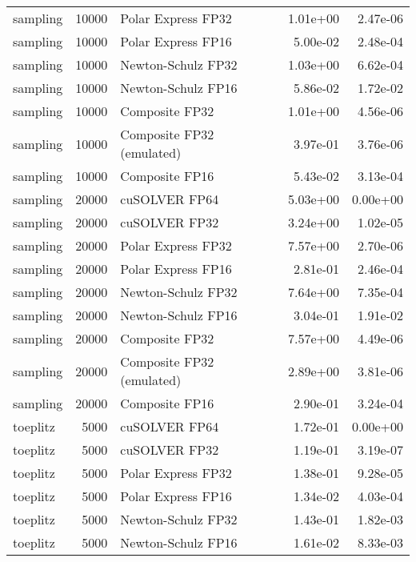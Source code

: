 \begin{table}
\begin{tabular}{lrlrr}
 sampling & 10000 &        Polar Express FP32 &  1.01e+00 &        2.47e-06 \\
 sampling & 10000 &        Polar Express FP16 &  5.00e-02 &        2.48e-04 \\
 sampling & 10000 &        Newton-Schulz FP32 &  1.03e+00 &        6.62e-04 \\
 sampling & 10000 &        Newton-Schulz FP16 &  5.86e-02 &        1.72e-02 \\
 sampling & 10000 &            Composite FP32 &  1.01e+00 &        4.56e-06 \\
 sampling & 10000 & Composite FP32 (emulated) &  3.97e-01 &        3.76e-06 \\
 sampling & 10000 &            Composite FP16 &  5.43e-02 &        3.13e-04 \\
 sampling & 20000 &             cuSOLVER FP64 &  5.03e+00 &        0.00e+00 \\
 sampling & 20000 &             cuSOLVER FP32 &  3.24e+00 &        1.02e-05 \\
 sampling & 20000 &        Polar Express FP32 &  7.57e+00 &        2.70e-06 \\
 sampling & 20000 &        Polar Express FP16 &  2.81e-01 &        2.46e-04 \\
 sampling & 20000 &        Newton-Schulz FP32 &  7.64e+00 &        7.35e-04 \\
 sampling & 20000 &        Newton-Schulz FP16 &  3.04e-01 &        1.91e-02 \\
 sampling & 20000 &            Composite FP32 &  7.57e+00 &        4.49e-06 \\
 sampling & 20000 & Composite FP32 (emulated) &  2.89e+00 &        3.81e-06 \\
 sampling & 20000 &            Composite FP16 &  2.90e-01 &        3.24e-04 \\
 toeplitz &  5000 &             cuSOLVER FP64 &  1.72e-01 &        0.00e+00 \\
 toeplitz &  5000 &             cuSOLVER FP32 &  1.19e-01 &        3.19e-07 \\
 toeplitz &  5000 &        Polar Express FP32 &  1.38e-01 &        9.28e-05 \\
 toeplitz &  5000 &        Polar Express FP16 &  1.34e-02 &        4.03e-04 \\
 toeplitz &  5000 &        Newton-Schulz FP32 &  1.43e-01 &        1.82e-03 \\
 toeplitz &  5000 &        Newton-Schulz FP16 &  1.61e-02 &        8.33e-03 \\

\end{tabular}
\end{table}
